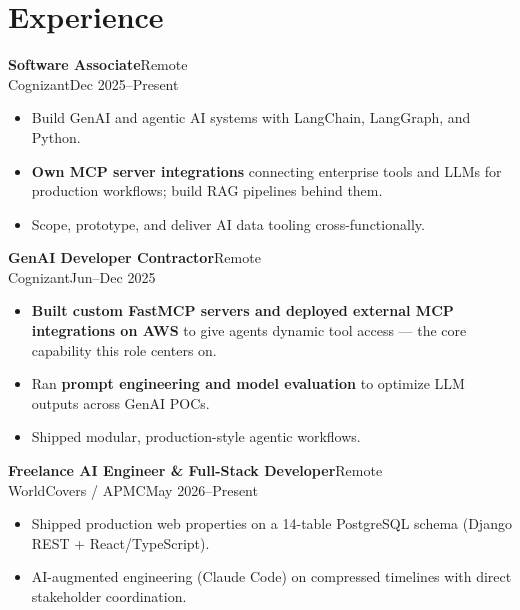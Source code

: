 \documentclass[10pt]{article}
\newcommand{\dentry}[4]{\noindent\textbf{#1}\hfill{#2}\\{#3}\hfill{#4}\par}
\begin{document}
\section*{Experience}
\dentry{Software Associate}{Remote}{Cognizant}{Dec 2025–Present}
\begin{itemize}
  \item Build GenAI and agentic AI systems with LangChain, LangGraph, and Python.
  \item \textbf{Own MCP server integrations} connecting enterprise tools and LLMs for production workflows; build RAG pipelines behind them.
  \item Scope, prototype, and deliver AI data tooling cross-functionally.
\end{itemize}
\dentry{GenAI Developer Contractor}{Remote}{Cognizant}{Jun–Dec 2025}
\begin{itemize}
  \item \textbf{Built custom FastMCP servers and deployed external MCP integrations on AWS} to give agents dynamic tool access — the core capability this role centers on.
  \item Ran \textbf{prompt engineering and model evaluation} to optimize LLM outputs across GenAI POCs.
  \item Shipped modular, production-style agentic workflows.
\end{itemize}
\dentry{Freelance AI Engineer \& Full-Stack Developer}{Remote}{WorldCovers / APMC}{May 2026–Present}
\begin{itemize}
  \item Shipped production web properties on a 14-table PostgreSQL schema (Django REST + React/TypeScript).
  \item AI-augmented engineering (Claude Code) on compressed timelines with direct stakeholder coordination.
\end{itemize}
\end{document}
